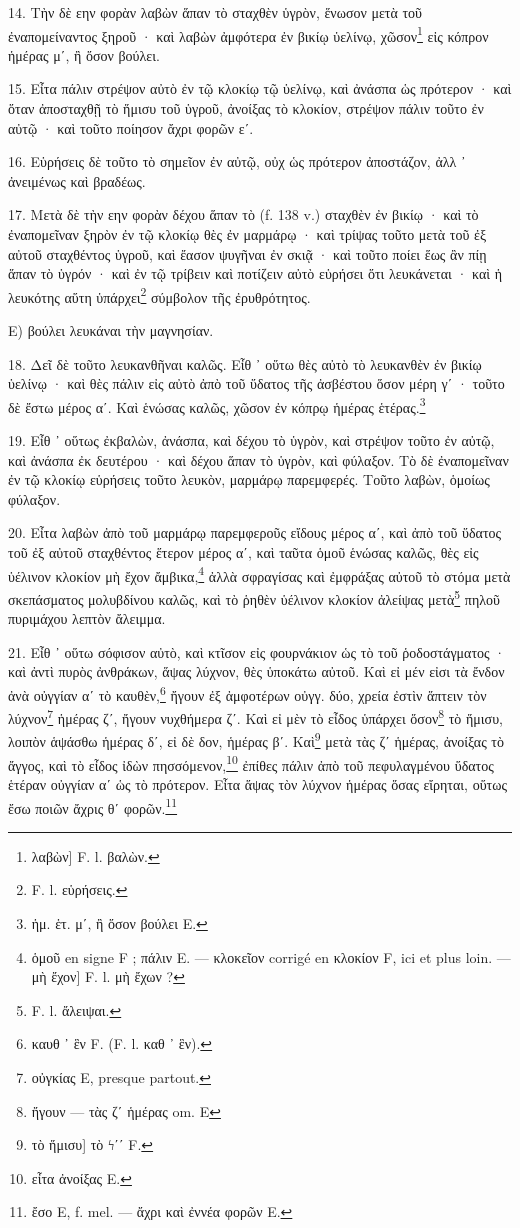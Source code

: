 \documentclass[a4paper, 11pt, oneside, polutonikogreek, french]{article}
\begin{document}
14. Τὴν δὲ εην φορὰν λαβὼν ἅπαν τὸ σταχθὲν ὑγρὸν, ἕνωσον μετὰ τοῦ ἐναπομείναντος ξηροῦ · καὶ λαβὼν ἀμφότερα ἐν βικίῳ ὑελίνῳ, χῶσον\footnote{λαβὼν] F. l. βαλὼν.} εἰς κόπρον ἡμέρας μʹ, ἢ ὅσον βούλει.

15. Εἶτα πάλιν στρέψον αὐτὸ ἐν τῷ κλοκίῳ τῷ ὑελίνῳ, καὶ ἀνάσπα ὡς πρότερον · καὶ ὅταν ἀποσταχθῇ τὸ ἥμισυ τοῦ ὑγροῦ, ἀνοίξας τὸ κλοκίον, στρέψον πάλιν τοῦτο ἐν αὐτῷ · καὶ τοῦτο ποίησον ἄχρι φορῶν εʹ.

16. Εὑρήσεις δὲ τοῦτο τὸ σημεῖον ἐν αὐτῷ, οὐχ ὡς πρότερον ἀποστάζον, ἀλλ ᾽ ἀνειμένως καὶ βραδέως.

17. Μετὰ δὲ τὴν εην φορὰν δέχου ἅπαν τὸ (f. 138 v.) σταχθὲν ἐν βικίῳ · καὶ τὸ ἐναπομεῖναν ξηρὸν ἐν τῷ κλοκίῳ θὲς ἐν μαρμάρῳ · καὶ τρίψας τοῦτο μετὰ τοῦ ἐξ αὐτοῦ σταχθέντος ὑγροῦ, καὶ ἔασον ψυγῆναι ἐν σκιᾷ · καὶ τοῦτο ποίει ἕως ἂν πίῃ ἅπαν τὸ ὑγρόν · καὶ ἐν τῷ τρίβειν καὶ ποτίζειν αὐτὸ εὑρήσει ὅτι λευκάνεται · καὶ ἡ λευκότης αὕτη ὑπάρχει\footnote{F. l. εὑρήσεις.} σύμβολον τῆς ἐρυθρότητος.

Ε) βούλει λευκάναι τὴν μαγνησίαν.

18. Δεῖ δὲ τοῦτο λευκανθῆναι καλῶς. Εἶθ ᾽ οὕτω θὲς αὐτὸ τὸ λευκανθὲν ἐν βικίῳ ὑελίνῳ · καὶ θὲς πάλιν εἰς αὐτὸ ἀπὸ τοῦ ὕδατος τῆς ἀσβέστου ὅσον μέρη γʹ · τοῦτο δὲ ἔστω μέρος αʹ. Καὶ ἑνώσας καλῶς, χῶσον ἐν κόπρῳ ἡμέρας ἑτέρας.\footnote{ἡμ. ἑτ. μʹ, ἢ ὅσον βούλει E.}

19. Εἶθ ᾽ οὕτως ἐκβαλὼν, ἀνάσπα, καὶ δέχου τὸ ὑγρὸν, καὶ στρέψον τοῦτο ἐν αὐτῷ, καὶ ἀνάσπα ἐκ δευτέρου · καὶ δέχου ἅπαν τὸ ὑγρὸν, καὶ φύλαξον. Τὸ δὲ ἐναπομεῖναν ἐν τῷ κλοκίῳ εὑρήσεις τοῦτο λευκὸν, μαρμάρῳ παρεμφερές. Τοῦτο λαβὼν, ὁμοίως φύλαξον.

20. Εἶτα λαβὼν ἀπὸ τοῦ μαρμάρῳ παρεμφεροῦς εἴδους μέρος αʹ, καὶ ἀπὸ τοῦ ὕδατος τοῦ ἐξ αὐτοῦ σταχθέντος ἕτερον μέρος αʹ, καὶ ταῦτα ὁμοῦ ἑνώσας καλῶς, θὲς εἰς ὑέλινον κλοκίον μὴ ἔχον ἄμβικα,\footnote{ὁμοῦ en signe F ; πάλιν E. --- κλοκεῖον corrigé en κλοκίον F, ici et plus loin. --- μὴ ἔχον] F. l. μὴ ἔχων ?} ἀλλὰ σφραγίσας καὶ ἐμφράξας αὐτοῦ τὸ στόμα μετὰ σκεπάσματος μολυβδίνου καλῶς, καὶ τὸ ῥηθὲν ὑέλινον κλοκίον ἀλείψας μετὰ\footnote{F. l. ἄλειψαι.} πηλοῦ πυριμάχου λεπτὸν ἄλειμμα.

21. Εἶθ ᾽ οὕτω σόφισον αὐτὸ, καὶ κτῖσον εἰς φουρνάκιον ὡς τὸ τοῦ ῥοδοστάγματος · καὶ ἀντὶ πυρὸς ἀνθράκων, ἅψας λύχνον, θὲς ὑποκάτω αὐτοῦ. Καὶ εἰ μέν εἰσι τὰ ἔνδον ἀνὰ οὐγγίαν αʹ τὸ καυθὲν,\footnote{καυθ ᾽ ἓν F. (F. l. καθ ᾽ ἓν).} ἤγουν ἐξ ἀμφοτέρων οὐγγ. δύο, χρεία ἐστὶν ἅπτειν τὸν λύχνον\footnote{οὐγκίας E, presque partout.} ἡμέρας ζʹ, ἤγουν νυχθήμερα ζʹ. Καὶ εἰ μὲν τὸ εἶδος ὑπάρχει ὅσον\footnote{ἤγουν --- τὰς ζʹ ἡμέρας om. E} τὸ ἥμισυ, λοιπὸν ἁψάσθω ἡμέρας δʹ, εἰ δὲ δον, ἡμέρας βʹ. Καὶ\footnote{τὸ ἥμισυ] τὸ ϟʹʹ F.} μετὰ τὰς ζʹ ἡμέρας, ἀνοίξας τὸ ἄγγος, καὶ τὸ εἶδος ἰδὼν πησσόμενον,\footnote{εἶτα ἀνοίξας E.} ἐπίθες πάλιν ἀπὸ τοῦ πεφυλαγμένου ὕδατος ἑτέραν οὐγγίαν αʹ ὡς τὸ πρότερον. Εἶτα ἅψας τὸν λύχνον ἡμέρας ὅσας εἴρηται, οὕτως ἔσω ποιῶν ἄχρις θʹ φορῶν.\footnote{ἔσο E, f. mel. --- ἄχρι καὶ ἐννέα φορῶν E.}
\end{document}
